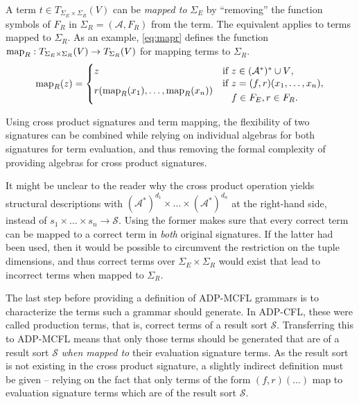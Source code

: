 \documentclass[
    a4paper,
    12pt,
    twoside,
    BCOR=12mm,
    parskip=half,
    chapterprefix,
    numbers=noenddot,
    bibliography=totoc
]{scrbook}
\begin{document}
A term $t \in T_{\Sigma_E \times \Sigma_R}(V)$ can be \emph{mapped to} $\Sigma_E$ by ``removing'' the function symbols of $F_R$ in $\Sigma_R=(\mathcal{A},F_R)$ from the term. The equivalent applies to terms mapped to $\Sigma_R$. As an example, \cref{eq:mapr} defines the function $\mathrm{map}_R : T_{\Sigma_E \times \Sigma_R}(V) \to T_{\Sigma_R}(V)$ for mapping terms to $\Sigma_R$.
\begin{equation}
	\label{eq:mapr}
	\mathrm{map}_R(z) = 
		\begin{cases}
			z & \text{if $z \in (\mathcal{A}^*)^* \cup V$,}\\
			r(\mathrm{map}_R(x_1),\ldots,\mathrm{map}_R(x_n)) & 
				\!\begin{aligned}
					\text{if } &z = (f, r)(x_1,\ldots,x_n),\\
					&f \in F_E, r \in F_R.
				\end{aligned}
		\end{cases}
\end{equation}

Using cross product signatures and term mapping, the flexibility of two signatures can be combined while relying on individual algebras for both signatures for term evaluation, and thus removing the formal complexity of providing algebras for cross product signatures.

\begin{remark}
	It might be unclear to the reader why the cross product operation yields structural descriptions with $(\mathcal{A}^*)^{d_1} \times \ldots \times (\mathcal{A}^*)^{d_n}$ at the right-hand side, instead of $s_1 \times \ldots \times s_n \to \mathcal{S}$. Using the former makes sure that every correct term can be mapped to a correct term in \emph{both} original signatures. If the latter had been used, then it would be possible to circumvent the restriction on the tuple dimensions, and thus correct terms over $\Sigma_E \times \Sigma_R$ would exist that lead to incorrect terms when mapped to $\Sigma_R$.
\end{remark}

The last step before providing a definition of ADP-MCFL grammars is to characterize the terms such a grammar should generate. In ADP-CFL, these were called production terms, that is, correct terms of a result sort $\mathcal{S}$. Transferring this to ADP-MCFL means that only those terms should be generated that are of a result sort $\mathcal{S}$ \emph{when mapped to} their evaluation signature terms. As the result sort is not existing in the cross product signature, a slightly indirect definition must be given -- relying on the fact that only terms of the form $(f,r)(\ldots)$ map to evaluation signature terms which are of the result sort $\mathcal{S}$.
\end{document}
